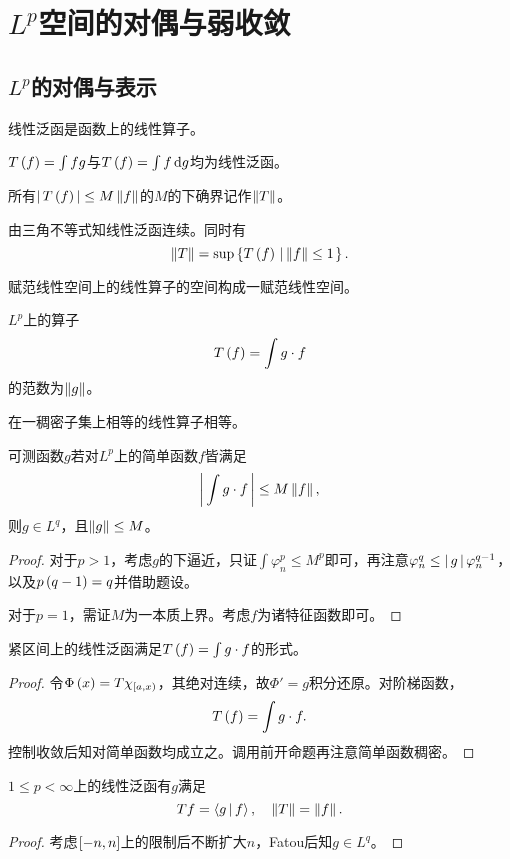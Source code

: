 \documentclass{ctexrep}
\begin{document}
  \section{$L^p$空间的对偶与弱收敛}
  \subsection{$L^p$的对偶与表示}
  \begin{definition}
    线性泛函是函数上的线性算子。
  \end{definition}
  \begin{ex}
    $T\left(f\right)=\int fg$与$T\left(f\right)=\int f \, \mathrm{d} g$均为线性泛函。
  \end{ex}
  \begin{definition}
    所有$\left|\, T\left(f\right) \,\right| \le M \left\| f \right\|$的$M$的下确界记作$\left\| T \right\|$。
  \end{definition}
  由三角不等式知线性泛函连续。同时有
  \[ \left\| T \right\| = \sup\left\{T\left(f\right) \, \left| \, \left\| f \right\|\le 1 \right.\right\}. \]
  \begin{proposition}
    赋范线性空间上的线性算子的空间构成一赋范线性空间。
  \end{proposition}
  \begin{proposition}
    $L^p$上的算子
    \[ T\left(f\right)=\int g\cdot f \]
    的范数为$\left\| g \right\|$。
  \end{proposition}
  \begin{proposition}
     在一稠密子集上相等的线性算子相等。
  \end{proposition}
  \begin{lemma}
    可测函数$g$若对$L^p$上的简单函数$f$皆满足
    \[ \left|\, \int g\cdot f \,\right| \le M \left\| f \right\|, \]
    则$g\in L^q$，且$\left\| g \right\|\le M$。
  \end{lemma}
  \begin{proof}
    对于$p>1$，考虑$g$的下逼近，只证$\int\varphi_n^p\le M^p$即可，再注意$\varphi_n^q\le\left|\, g \,\right|\varphi_n^{q-1}$，以及$p\left(q-1\right)=q$并借助题设。
    \par
    对于$p=1$，需证$M$为一本质上界。考虑$f$为诸特征函数即可。
  \end{proof}
  \begin{theorem}
    紧区间上的线性泛函满足$T\left(f\right)=\int g\cdot f$的形式。
  \end{theorem}
  \begin{proof}
    令$\Phi\left(x\right)=T\chi_{\left[a,x\right)}$，其绝对连续，故$\Phi'=g$积分还原。对阶梯函数，
    \[ T\left(f\right) = \int g\cdot f. \]
    控制收敛后知对简单函数均成立之。调用前开命题再注意简单函数稠密。
  \end{proof}
  \begin{theorem}[$L^p$的Riesz表示定理]
    $1\le p<\infty$上的线性泛函有$g$满足
    \[ Tf = \Braket{g|f}, \quad \left\| T \right\| = \left\| f \right\|. \]
  \end{theorem}
  \begin{proof}
    考虑$\left[-n,n\right]$上的限制后不断扩大$n$，Fatou后知$g\in L^q$。
  \end{proof}
\end{document}
